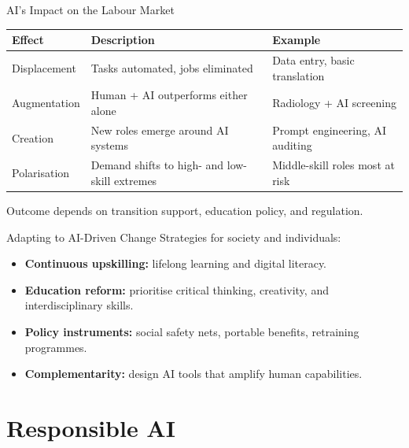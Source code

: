 \documentclass[10pt]{beamer}
\begin{document}
\begin{frame}{AI's Impact on the Labour Market}
    \small
    \setlength{\tabcolsep}{7pt}
    \renewcommand{\arraystretch}{1.25}
    \begin{tabularx}{\textwidth}{l X X}
        \toprule
        \textbf{Effect} & \textbf{Description} & \textbf{Example} \\
        \midrule
        Displacement & Tasks automated, jobs eliminated & Data entry, basic translation \\
        Augmentation & Human + AI outperforms either alone & Radiology + AI screening \\
        Creation & New roles emerge around AI systems & Prompt engineering, AI auditing \\
        Polarisation & Demand shifts to high- and low-skill extremes & Middle-skill roles most at risk \\
        \bottomrule
    \end{tabularx}

    \vspace{0.2cm}
    Outcome depends on transition support, education policy, and regulation.
\end{frame}

\begin{frame}{Adapting to AI-Driven Change}
    Strategies for society and individuals:
    \begin{itemize}
        \item \textbf{Continuous upskilling:} lifelong learning and digital literacy.
        \item \textbf{Education reform:} prioritise critical thinking, creativity, and interdisciplinary skills.
        \item \textbf{Policy instruments:} social safety nets, portable benefits, retraining programmes.
        \item \textbf{Complementarity:} design AI tools that amplify human capabilities.
    \end{itemize}
\end{frame}

\section{Responsible AI}
\end{document}
